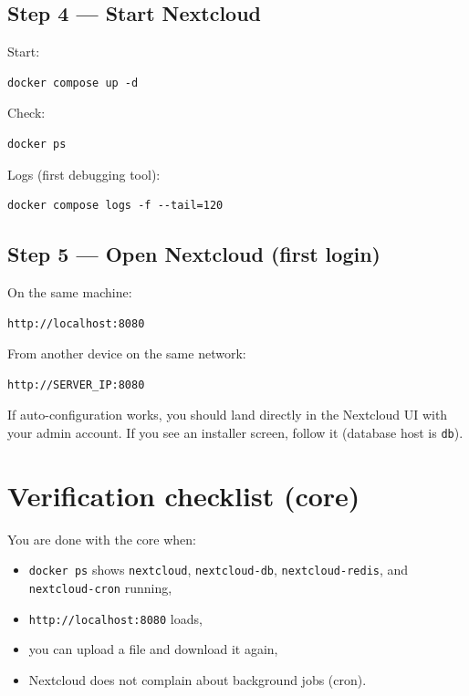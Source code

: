 \subsection{Step 4 --- Start Nextcloud}
Start:

\begin{lstlisting}
docker compose up -d
\end{lstlisting}

Check:

\begin{lstlisting}
docker ps
\end{lstlisting}

Logs (first debugging tool):

\begin{lstlisting}
docker compose logs -f --tail=120
\end{lstlisting}

\subsection{Step 5 --- Open Nextcloud (first login)}
On the same machine:

\begin{lstlisting}
http://localhost:8080
\end{lstlisting}

From another device on the same network:

\begin{lstlisting}
http://SERVER_IP:8080
\end{lstlisting}

If auto-configuration works, you should land directly in the Nextcloud UI with your admin account.
If you see an installer screen, follow it (database host is \texttt{db}).


\section{Verification checklist (core)}
\label{sec:nc_core_verify}
You are done with the core when:
\begin{itemize}[leftmargin=*]
  \item \texttt{docker ps} shows \texttt{nextcloud}, \texttt{nextcloud-db}, \texttt{nextcloud-redis}, and \texttt{nextcloud-cron} running,
  \item \texttt{http://localhost:8080} loads,
  \item you can upload a file and download it again,
  \item Nextcloud does not complain about background jobs (cron).
\end{itemize}

